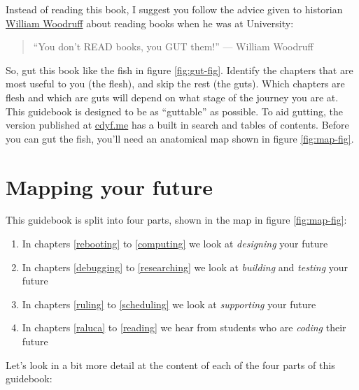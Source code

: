 \documentclass[
]{book}
\providecommand{\tightlist}{%
  \setlength{\itemsep}{0pt}\setlength{\parskip}{0pt}}
\begin{document}
Instead of reading this book, I suggest you follow the advice given to historian \href{https://en.wikipedia.org/wiki/William_Woodruff}{William Woodruff} about reading books when he was at University:

\begin{quote}
``You don't READ books, you GUT them!''
\hfill --- William Woodruff \citep{nabend}
\end{quote}

So, gut this book like the fish in figure \ref{fig:gut-fig}. Identify the chapters that are most useful to you (the flesh), and skip the rest (the guts). Which chapters are flesh and which are guts will depend on what stage of the journey you are at. This guidebook is designed to be as ``guttable'' as possible. To aid gutting, the version published at \href{https://www.cdyf.me/}{cdyf.me} has a built in search and tables of contents. Before you can gut the fish, you'll need an anatomical map shown in figure \ref{fig:map-fig}.

\hypertarget{mapping}{%
\section{Mapping your future}\label{mapping}}

This guidebook is split into four parts, shown in the map in figure \ref{fig:map-fig}:

\begin{enumerate}
\def\labelenumi{\arabic{enumi}.}
\tightlist
\item
  In chapters \ref{rebooting} to \ref{computing} we look at \emph{designing} your future
\item
  In chapters \ref{debugging} to \ref{researching} we look at \emph{building} and \emph{testing} your future
\item
  In chapters \ref{ruling} to \ref{scheduling} we look at \emph{supporting} your future
\item
  In chapters \ref{raluca} to \ref{reading} we hear from students who are \emph{coding} their future
\end{enumerate}

Let's look in a bit more detail at the content of each of the four parts of this guidebook:
\end{document}
